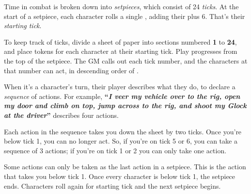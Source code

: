 
Time in combat is broken down into \emph{setpieces}, which consist of 24 \emph{ticks}. At the start of a setpiece, each character rolls a single , adding their  plus 6. That's their \emph{starting tick}.

To keep track of ticks, divide a sheet of paper into sections numbered \textbf{1} to \textbf{24}, and place tokens for each character at their starting tick. Play progresses from the top of the setpiece. The GM calls out each tick number, and the characters at that number can act, in descending order of .

When it's a character's turn, their player describes what they do, to declare a \emph{sequence} of actions. For example, \textbf{``\emph{I veer my vehicle over to the rig, open my door and climb on top, jump across to the rig, and shoot my Glock at the driver}''} describes four actions.

Each action in the sequence takes you down the sheet by two ticks. Once you're below tick 1, you can no longer act. So, if you're on tick 5 or 6, you can take a sequence of 3 actions; if you're on tick 1 or 2 you can only take one action.

Some actions can only be taken as the last action in a setpiece. This is the action that takes you below tick 1. Once every character is below tick 1, the setpiece ends. Characters roll again for starting tick and the next setpiece begins.
